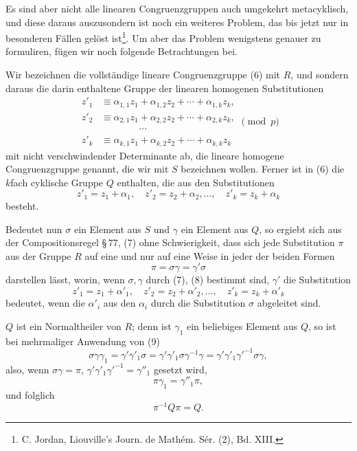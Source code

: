 \documentclass[11pt]{article}
\begin{document}
Es sind aber nicht alle linearen Congruenzgruppen auch umgekehrt metacyklisch, und diese daraus auszusondern ist noch ein weiteres Problem, das bis jetzt nur in besonderen Fällen gelöst ist\footnote{C. Jordan, Liouville's Journ. de Mathém. Sér. (2), Bd. XIII.}. Um aber das Problem wenigstens genauer zu formuliren, fügen wir noch folgende Betrachtungen bei.

Wir bezeichnen die vollständige lineare Congruenzgruppe (6) mit $R$, und sondern daraus die darin enthaltene Gruppe der linearen homogenen Substitutionen
\begin{equation}
\begin{aligned}
 z'_1&\equiv \alpha_{1,1}z_1+\alpha_{1,2}z_2+\cdots+\alpha_{1,k}z_k,\\
 z'_2&\equiv \alpha_{2,1}z_1+\alpha_{2,2}z_2+\cdots+\alpha_{2,k}z_k,\\
 &\hspace{4em}\cdots\\
 z'_k&\equiv \alpha_{k,1}z_1+\alpha_{k,2}z_2+\cdots+\alpha_{k,k}z_k
\end{aligned}
\pmod p
 \tag{7}
\end{equation}
mit nicht verschwindender Determinante ab, die lineare homogene Congruenzgruppe genannt, die wir mit $S$ bezeichnen wollen. Ferner ist in (6) die $k$fach cyklische Gruppe $Q$ enthalten, die aus den Substitutionen
\begin{equation}
 z'_1=z_1+\alpha_1,\quad
 z'_2=z_2+\alpha_2,\ldots,\quad
 z'_k=z_k+\alpha_k
 \tag{8}
\end{equation}
besteht.

Bedeutet nun $\sigma$ ein Element aus $S$ und $\gamma$ ein Element aus $Q$, so ergiebt sich aus der Compositionsregel \S\,77, (7) ohne Schwierigkeit, dass sich jede Substitution $\pi$ aus der Gruppe $R$ auf eine und nur auf eine Weise in jeder der beiden Formen
\begin{equation}
 \pi=\sigma\gamma=\gamma'\sigma
 \tag{9}
\end{equation}
darstellen lässt, worin, wenn $\sigma,\gamma$ durch (7), (8) bestimmt sind, $\gamma'$ die Substitution
\begin{equation}
 z'_1=z_1+\alpha'_1,\quad
 z'_2=z_2+\alpha'_2,\ldots,\quad
 z'_k=z_k+\alpha'_k
 \tag{10}
\end{equation}
bedeutet, wenn die $\alpha'_i$ aus den $\alpha_i$ durch die Substitution $\sigma$ abgeleitet sind.

$Q$ ist ein Normaltheiler von $R$; denn ist $\gamma_1$ ein beliebiges Element aus $Q$, so ist bei mehrmaliger Anwendung von (9)
\[
 \sigma\gamma\gamma_1
 =\gamma'\gamma'_1\sigma
 =\gamma'\gamma'_1\sigma\gamma^{-1}\gamma
 =\gamma'\gamma'_1\gamma'^{-1}\sigma\gamma,
\]
also, wenn $\sigma\gamma=\pi$, $\gamma'\gamma'_1\gamma'^{-1}=\gamma''_1$ gesetzt wird,
\[
 \pi\gamma_1=\gamma''_1\pi,
\]
und folglich
\begin{equation}
 \pi^{-1}Q\pi=Q .
 \tag{11}
\end{equation}
\end{document}
